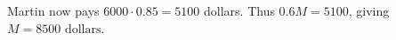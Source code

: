 Martin now pays $6000\cdot0.85=5100$ dollars. Thus $0.6M=5100$, giving $\boxed{M=8500\text{ dollars}}$.
